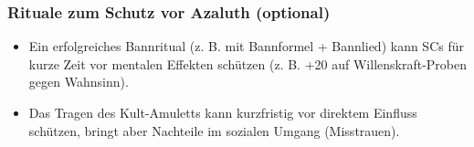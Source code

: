 \subsubsection*{Rituale zum Schutz vor Azaluth (optional)}
\begin{itemize}
\item Ein erfolgreiches Bannritual (z. B. mit Bannformel + Bannlied) kann SCs für kurze Zeit vor mentalen Effekten schützen (z. B. +20 auf Willenskraft-Proben gegen Wahnsinn).
\item Das Tragen des Kult-Amuletts kann kurzfristig vor direktem Einfluss schützen, bringt aber Nachteile im sozialen Umgang (Misstrauen).
\end{itemize}
\newpage